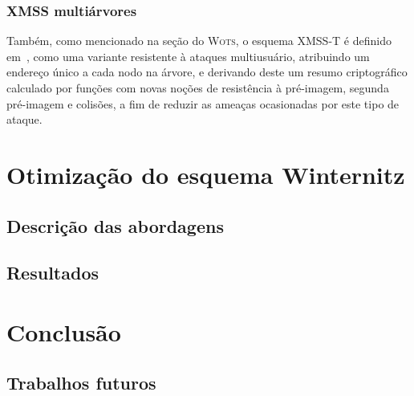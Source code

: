 \documentclass[12pt]{report}
\begin{document}
\subsection{XMSS multiárvores}


Também, como mencionado na seção do \textsc{Wots}, o esquema XMSS-T é definido em~\cite{Hulsing:2016:MMA:3081852.3081871}, como uma variante resistente à ataques multiusuário, atribuindo um endereço único a cada nodo na árvore, e derivando deste um resumo criptográfico calculado por funções com novas noções de resistência à pré-imagem, segunda pré-imagem e colisões, a fim de reduzir as ameaças ocasionadas por este tipo de ataque.


\chapter{Otimização do esquema Winternitz}

\section{Descrição das abordagens}


\section{Resultados}

\chapter{Conclusão}

\section{Trabalhos futuros}



\end{document}
